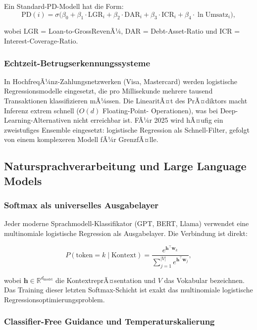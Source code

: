 ﻿\documentclass[12pt, a4paper]{article}
\theoremstyle{definition}
\theoremstyle{remark}
\newcommand{\R}{\mathbb{R}}
\newcommand{\sigmoid}{\sigma}
\newcommand{\vw}{\bm{w}}
\newcommand{\T}{\top}
\begin{document}
Ein Standard-PD-Modell hat die Form:
\begin{equation}
  \mathrm{PD}(i) = \sigmoid\!\bigl(\beta_0 + \beta_1 \cdot \text{LGR}_i + \beta_2 \cdot \text{DAR}_i
  + \beta_3 \cdot \text{ICR}_i + \beta_4 \cdot \ln\text{Umsatz}_i\bigr),
\end{equation}

wobei LGR = Loan-to-GrossRevenÃ¼, DAR = Debt-Asset-Ratio und ICR = Interest-Coverage-Ratio.

\subsubsection{Echtzeit-Betrugserkennungssysteme}

In HochfreqÃ¼nz-Zahlungsnetzwerken (Visa, Mastercard) werden logistische Regressionsmodelle
eingesetzt, die pro Millisekunde mehrere tausend Transaktionen klassifizieren mÃ¼ssen.
Die LinearitÃ¤t des PrÃ¤diktors macht Inferenz extrem schnell ($O(d)$ Floating-Point-
Operationen), was bei Deep-Learning-Alternativen nicht erreichbar ist. FÃ¼r 2025 wird
hÃ¤ufig ein zweistufiges Ensemble eingesetzt: logistische Regression als Schnell-Filter,
gefolgt von einem komplexeren Modell fÃ¼r GrenzfÃ¤lle.

\subsection{Natursprachverarbeitung und Large Language Models}

\subsubsection{Softmax als universelles Ausgabelayer}

Jeder moderne Sprachmodell-Klassifikator (GPT, BERT, Llama) verwendet eine multinomiale
logistische Regression als Ausgabelayer. Die Verbindung ist direkt:

\begin{equation}
  P(\text{token} = k \mid \text{Kontext}) = \frac{e^{\bm{h}^\T\vw_k}}{\sum_{j=1}^{|V|} e^{\bm{h}^\T\vw_j}},
\end{equation}

wobei $\bm{h} \in \R^{d_{\text{model}}}$ die KontextreprÃ¤sentation und $V$ das Vokabular
bezeichnen. Das Training dieser letzten Softmax-Schicht ist exakt das multinomiale logistische
Regressionsoptimierungsproblem.

\subsubsection{Classifier-Free Guidance und Temperaturskalierung}
\end{document}
